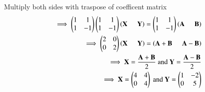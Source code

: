 \documentclass[journal]{IEEEtran}
\begin{document}
Multiply both sides with traspose of coefficent matrix
\begin{align}
    \implies \begin{pmatrix}
        1 & 1\\
         1 & -1
    \end{pmatrix} \begin{pmatrix}
        1 & 1\\
         1 & -1
    \end{pmatrix} \left(\mathbf{X}\hspace{0.5cm}\mathbf{Y}\right)=\begin{pmatrix}
        1 & 1\\
         1 & -1
    \end{pmatrix} \left(\mathbf{A}\hspace{0.5cm}\mathbf{B}\right)\\
    \implies \begin{pmatrix}
        2 & 0\\
         0 & 2
    \end{pmatrix} \left(\mathbf{X}\hspace{0.5cm}\mathbf{Y}\right)= \left(\mathbf{A+B}\hspace{0.5cm}\mathbf{A-B}\right)\\
    \implies \mathbf{X}=\frac{\mathbf{A+B}}{2} \text{ and } \mathbf{Y}=\frac{\mathbf{A-B}}{2}\\ \implies \mathbf{X}=\begin{pmatrix}
        4 & 4\\
         0 & 4
    \end{pmatrix} \text{ and } \mathbf{Y}=\begin{pmatrix}
        1 & -2\\
         0 & 5
    \end{pmatrix}
    \end{align}
\end{document}
